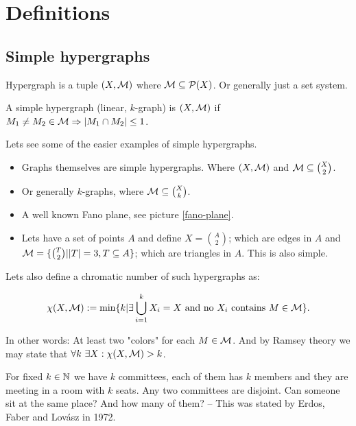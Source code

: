 \chapter{Definitions}

\section{Simple hypergraphs}

\begin{defn}
	Hypergraph is a tuple $(X, \mathcal{M})$ where $\mathcal{M} \subseteq \mathcal{P}(X)$. Or generally just a set system.
\end{defn}

\begin{defn}
	A simple hypergraph (linear, $k$-graph) is $(X,\mathcal{M})$ if $M_1 \neq M_2 \in \mathcal{M} \Rightarrow |M_1 \cap M_2| \leq 1$.
\end{defn}

\begin{example}
	Lets see some of the easier examples of simple hypergraphs.
	
	\begin{itemize}
		\item Graphs themselves are simple hypergraphs. Where $(X, \mathcal{M})$ and $\mathcal{M} \subseteq \binom{X}{2}$.
		\item Or generally $k$-graphs, where $\mathcal{M} \subseteq \binom{X}{k}$.
		\item A well known Fano plane, see picture \ref{fano-plane}.
		\item Lets have a set of points $A$ and define $X = \binom{A}{2}$; which are edges in $A$ and $\mathcal{M} = \{\binom{T}{2} | |T| = 3, T \subseteq A\}$; which are triangles in $A$. This is also simple.
	\end{itemize}
\end{example}

Lets also define a chromatic number of such hypergraphs as:

$$
\chi (X,\mathcal{M}) := \min \{k | \exists \bigcup_{i=1}^k X_i = X \text{ and no } X_i \text{ contains } M \in \mathcal{M}\}.
$$

\noindent In other words: At least two "colors" for each $M \in \mathcal{M}$. And by Ramsey theory we may state that $\forall k \ \exists X: \chi(X,\mathcal{M}) > k$.

\begin{example}
	For fixed $k \in \mathbb{N}$ we have $k$ committees, each of them has $k$ members and they are meeting in a room with $k$ seats. Any two committees are disjoint. Can someone sit at the same place? And how many of them? -- This was stated by Erdos, Faber and Lovász in 1972.
\end{example}

